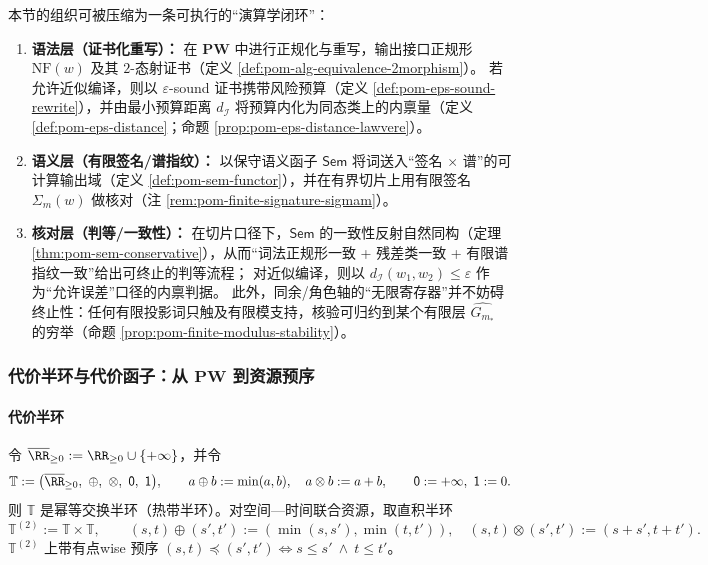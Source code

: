 \begin{remark}\label{rem:pom-rewrite-semantic-check-loop}
本节的组织可被压缩为一条可执行的“演算学闭环”：
\begin{enumerate}
  \item \textbf{语法层（证书化重写）：}
  在 \(\mathbf{PW}\) 中进行正规化与重写，输出接口正规形 \(\mathrm{NF}(w)\) 及其 \(2\)-态射证书（定义 \ref{def:pom-alg-equivalence-2morphism}）。
  若允许近似编译，则以 \(\varepsilon\)-sound 证书携带风险预算（定义 \ref{def:pom-eps-sound-rewrite}），并由最小预算距离 \(d_{\mathcal I}\) 将预算内化为同态类上的内禀量（定义 \ref{def:pom-eps-distance}；命题 \ref{prop:pom-eps-distance-lawvere}）。
  \item \textbf{语义层（有限签名/谱指纹）：}
  以保守语义函子 \(\mathsf{Sem}\) 将词送入“签名 \(\times\) 谱”的可计算输出域（定义 \ref{def:pom-sem-functor}），并在有界切片上用有限签名 \(\Sigma_m(w)\) 做核对（注 \ref{rem:pom-finite-signature-sigmam}）。
  \item \textbf{核对层（判等/一致性）：}
  在切片口径下，\(\mathsf{Sem}\) 的一致性反射自然同构（定理 \ref{thm:pom-sem-conservative}），从而“词法正规形一致 + 残差类一致 + 有限谱指纹一致”给出可终止的判等流程；
  对近似编译，则以 \(d_{\mathcal I}(w_1,w_2)\le\varepsilon\) 作为“允许误差”口径的内禀判据。
  此外，同余/角色轴的“无限寄存器”并不妨碍终止性：任何有限投影词只触及有限模支持，核验可归约到某个有限层 \(\widehat{G_{m_\ast}}\) 的穷举（命题 \ref{prop:pom-finite-modulus-stability}）。
\end{enumerate}
\end{remark}

\subsubsection{代价半环与代价函子：从 \texorpdfstring{$\mathbf{PW}$}{PW} 到资源预序}\label{subsec:pom-cost-functor}
\paragraph{代价半环}
令 \(\overline{\RR}_{\ge 0}:=\RR_{\ge 0}\cup\{+\infty\}\)，并令
$$
\mathbb{T}:=\bigl(\overline{\RR}_{\ge 0},\ \oplus,\ \otimes,\ \mathsf 0,\ \mathsf 1\bigr),
\qquad
a\oplus b:=\min(a,b),\quad a\otimes b:=a+b,
\qquad
\mathsf 0:=+\infty,\ \mathsf 1:=0.
$$
则 \(\mathbb{T}\) 是幂等交换半环（热带半环）。对空间—时间联合资源，取直积半环
$$
\mathbb{T}^{(2)}:=\mathbb{T}\times \mathbb{T},
\qquad
(s,t)\oplus(s',t'):=(\min(s,s'),\min(t,t')),
\quad
(s,t)\otimes(s',t'):=(s+s',t+t').
$$
\(\mathbb{T}^{(2)}\) 上带有点wise 预序 \((s,t)\preceq(s',t')\iff s\le s'\ \wedge\ t\le t'\)。

